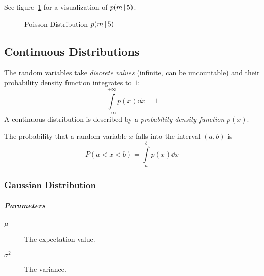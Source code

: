 					See figure~\ref{fig:poissonDistribution} for a visualization of \( p(m \,\vert\, 5) \).

					\begin{figure}
						\centering
						\caption{Poisson Distribution \( p(m \,\vert\, 5) \)}
						\label{fig:poissonDistribution}
					\end{figure}

		\subsection{Continuous Distributions}
			The random variables take \emph{discrete values} (infinite, can be uncountable) and their probability density function integrates to \(1\):
			\begin{equation}
				\int\limits_{-\infty}^{+\infty} p(x) \dd{x} = 1
			\end{equation}
			A continuous distribution is described by a \emph{probability density function} \(p(x)\).

			The probability that a random variable \( x \) falls into the interval \( (a, b) \) is
			\begin{equation}
				P(a < x < b) = \int\limits_a^b p(x) \dd{x}
			\end{equation}

			\subsubsection{Gaussian Distribution}
				\subparagraph{Parameters}
					\begin{description}
						\item[\(\mu\)] The expectation value.
						\item[\(\sigma^2\)] The variance.
					\end{description}

